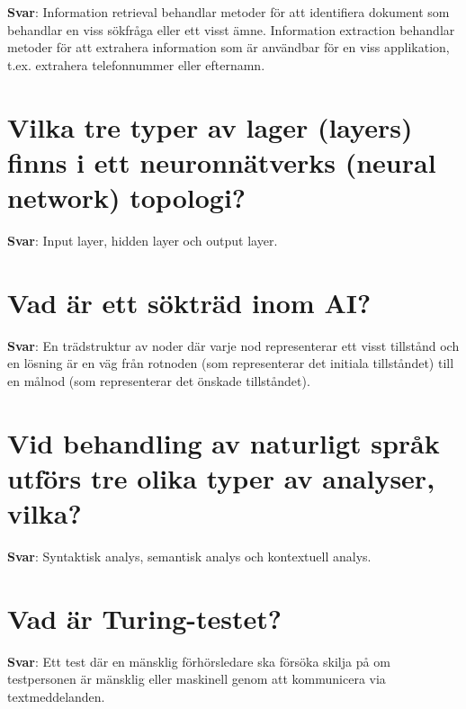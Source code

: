 \documentclass[a4paper,11pt,oneside]{book}
\begin{document}
\begin{sloppypar}
\label{q:318:sa:sv:True}

\textbf{Svar}: Information retrieval behandlar metoder f\"or att identifiera dokument som behandlar en viss s\"okfr\r{a}ga eller ett visst \"amne. Information extraction behandlar metoder f\"or att extrahera information som \"ar anv\"andbar f\"or en viss applikation, t.ex. extrahera telefonnummer eller efternamn.



\section{Vilka tre typer av lager (layers) finns i ett neuronn\"atverks (neural network) topologi?}

\label{q:319:sa:sv:True}

\textbf{Svar}: Input layer, hidden layer och output layer.



\section{Vad \"ar ett s\"oktr\"ad inom AI?}

\label{q:320:sa:sv:True}

\textbf{Svar}: En tr\"adstruktur av noder d\"ar varje nod representerar ett visst tillst\r{a}nd och en l\"osning \"ar en v\"ag fr\r{a}n rotnoden (som representerar det initiala tillst\r{a}ndet) till en m\r{a}lnod (som representerar det \"onskade tillst\r{a}ndet).



\section{Vid behandling av naturligt spr\r{a}k utf\"ors tre olika typer av analyser, vilka?}

\label{q:321:sa:sv:True}

\textbf{Svar}: Syntaktisk analys, semantisk analys och kontextuell analys.



\section{Vad \"ar Turing-testet?}

\label{q:322:sa:sv:True}

\textbf{Svar}: Ett test d\"ar en m\"ansklig f\"orh\"orsledare ska f\"ors\"oka skilja p\r{a} om testpersonen \"ar m\"ansklig eller maskinell genom att kommunicera via textmeddelanden.




\end{sloppypar}
\end{document}
